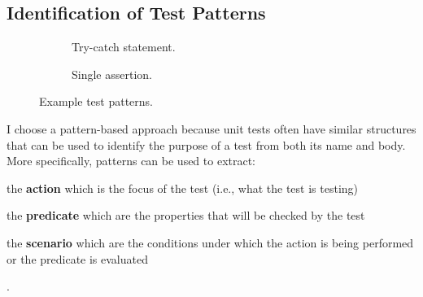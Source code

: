 \subsection{Identification of Test Patterns}
\label{sec:test_patterns}

\begin{figure}[t]
\centering
\begin{subfigure}{0.9\textwidth}
    \caption{Try-catch statement.}
    \label{PatternExample_tc}
\end{subfigure}
\begin{subfigure}{0.9\textwidth}
    \caption{Single assertion.}
    \label{PatternExample_allA}
\end{subfigure}
\caption{Example test patterns.}
\label{fig:example-patterns}
\end{figure}


I choose a pattern-based approach because unit tests often have similar structures that can be used to identify the purpose of a test from both its name and body.
%
More specifically, patterns can be used to extract:
\begin{enumerate*}
    \item the \textbf{action} which is the focus of the test (i.e., what the test is testing)
    \item the \textbf{predicate} which are the properties that will be checked by the test
    \item the \textbf{scenario} which are the conditions under which the action is being performed or the predicate is evaluated
\end{enumerate*}.


